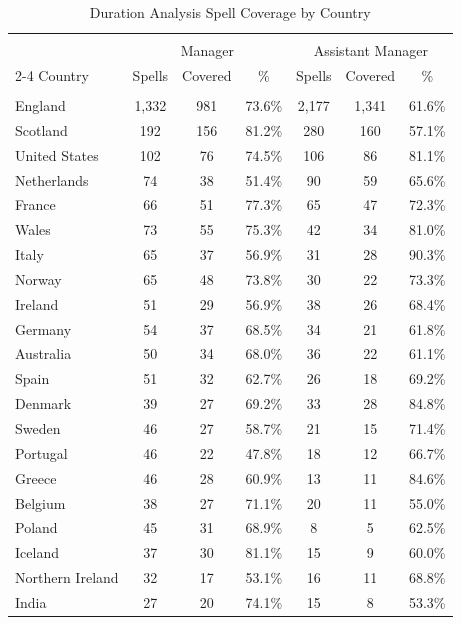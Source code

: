 \begin{table}[!htbp]
\centering
\caption{Duration Analysis Spell Coverage by Country}
\label{tab:coverage_merged}
\footnotesize
\setlength\tabcolsep{4pt}
\begin{threeparttable}
\begin{tabular}{lcccccc}
\\[-1.8ex]\hline
\hline \\[-1.8ex]
 & \multicolumn{3}{c}{Manager} & \multicolumn{3}{c}{Assistant Manager} \\
\cline{2-4} \cline{5-7}
Country & Spells & Covered & \% & Spells & Covered & \% \\
\hline \\[-1.8ex]
England & 1,332 & 981 & 73.6\% & 2,177 & 1,341 & 61.6\% \\ 
Scotland & 192 & 156 & 81.2\% & 280 & 160 & 57.1\% \\ 
United States & 102 & 76 & 74.5\% & 106 & 86 & 81.1\% \\ 
Netherlands & 74 & 38 & 51.4\% & 90 & 59 & 65.6\% \\ 
France & 66 & 51 & 77.3\% & 65 & 47 & 72.3\% \\ 
Wales & 73 & 55 & 75.3\% & 42 & 34 & 81.0\% \\ 
Italy & 65 & 37 & 56.9\% & 31 & 28 & 90.3\% \\ 
Norway & 65 & 48 & 73.8\% & 30 & 22 & 73.3\% \\ 
Ireland & 51 & 29 & 56.9\% & 38 & 26 & 68.4\% \\ 
Germany & 54 & 37 & 68.5\% & 34 & 21 & 61.8\% \\ 
Australia & 50 & 34 & 68.0\% & 36 & 22 & 61.1\% \\ 
Spain & 51 & 32 & 62.7\% & 26 & 18 & 69.2\% \\ 
Denmark & 39 & 27 & 69.2\% & 33 & 28 & 84.8\% \\ 
Sweden & 46 & 27 & 58.7\% & 21 & 15 & 71.4\% \\ 
Portugal & 46 & 22 & 47.8\% & 18 & 12 & 66.7\% \\ 
Greece & 46 & 28 & 60.9\% & 13 & 11 & 84.6\% \\ 
Belgium & 38 & 27 & 71.1\% & 20 & 11 & 55.0\% \\ 
Poland & 45 & 31 & 68.9\% & 8 & 5 & 62.5\% \\ 
Iceland & 37 & 30 & 81.1\% & 15 & 9 & 60.0\% \\ 
Northern Ireland & 32 & 17 & 53.1\% & 16 & 11 & 68.8\% \\ 
India & 27 & 20 & 74.1\% & 15 & 8 & 53.3\% \\ 

\end{tabular}
\end{threeparttable}
\end{table}
